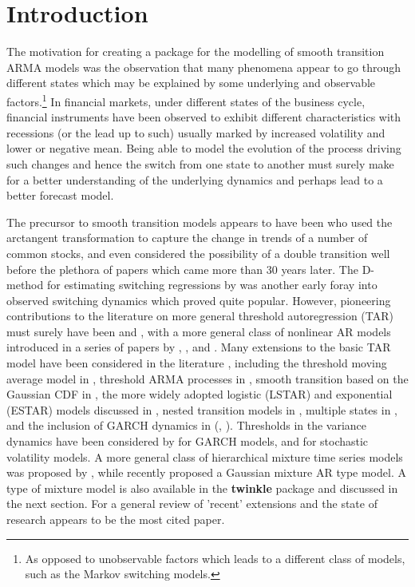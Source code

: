 \section{Introduction}
The motivation for creating a package for the modelling of smooth transition
ARMA models was the observation that many phenomena appear to go
through different states which may be explained by some underlying and
observable factors.\footnote{As opposed to unobservable factors which leads to
a different class of models, such as the Markov switching models.}
In financial markets, under different states of the business cycle, financial
instruments have been observed to exhibit different characteristics with
recessions (or the lead up to such) usually marked by increased volatility and lower 
or negative mean. Being able to model the evolution of the process driving such 
changes and hence the switch from one state to another must surely make for a 
better understanding of the underlying dynamics and perhaps lead to a better
forecast model.

The precursor to smooth transition models appears to have been
\cite{Carmichael1928} who used the arctangent transformation to capture the
change in trends of a number of common stocks, and even considered the
possibility of a double transition well before the plethora of papers which 
came more than 30 years later. The D-method for estimating switching regressions
by \cite{Quandt1958} was another early foray into observed switching
dynamics which proved quite popular. However, pioneering contributions to the
literature on more general threshold autoregression (TAR) must surely have been
\cite{Tong1980} and \cite{Tong1981}, with a more general class of nonlinear AR
models introduced in a series of papers by \cite{Billings1983}, 
\cite{Billings1986}, and \cite{Zhu1993}. Many extensions to the basic TAR model
have been considered in the literature , including the threshold moving average
model in \cite{Gooijer1998}, threshold ARMA processes in \cite{Brockwell1992},
smooth transition based on the Gaussian CDF in \cite{ChanTong1986}, the more 
widely adopted logistic (LSTAR) and exponential (ESTAR) models discussed  in
\cite{Terasvirta1994}, nested transition models in \cite{Astatkie1997}, multiple
states in \cite{Dijk1999}, and the inclusion of GARCH dynamics in 
\citeauthor{Chan2002}(\citeyear{Chan2002}, \citeyear{Chan2003}). Thresholds in 
the variance dynamics have been considered by \cite{Zakoian1994} for GARCH
models, and \cite{So2002} for stochastic volatility models. A more general 
class of hierarchical mixture time series models was proposed by
\cite{Huerta2003}, while \cite{Kalliovirta2012} recently proposed a Gaussian
mixture AR type model. A type of mixture model is also available in the
\textbf{twinkle} package and discussed in the next section. For a general review
of 'recent' extensions and the state of research \cite{Dijk2002} appears to be
the most cited paper.

